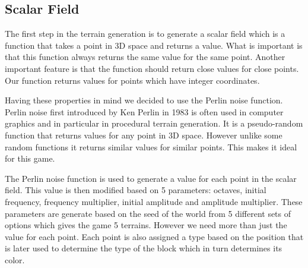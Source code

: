 \subsection{Scalar Field} \label{subsec:scalar_field}
The first step in the terrain generation is to generate a scalar field which is a function that takes a point in 3D space and returns a value.
What is important is that this function always returns the same value for the same point.
Another important feature is that the function should return close values for close points.
Our function returns values for points which have integer coordinates.

Having these properties in mind we decided to use the Perlin noise function.
Perlin noise first introduced by Ken Perlin in 1983 \cite{Perlin-Noise} is often used in computer graphics and in particular in procedural terrain generation.
It is a pseudo-random function that returns values for any point in 3D space.
However unlike some random functions it returns similar values for similar points.
This makes it ideal for this game.

The Perlin noise function is used to generate a value for each point in the scalar field.
This value is then modified based on 5 parameters: octaves, initial frequency, frequency multiplier, initial amplitude and amplitude multiplier.
These parameters are generate based on the seed of the world from 5 different sets of options which gives the game 5 terrains.
However we need more than just the value for each point.
Each point is also assigned a type based on the position that is later used to determine the type of the block which in turn determines its color.